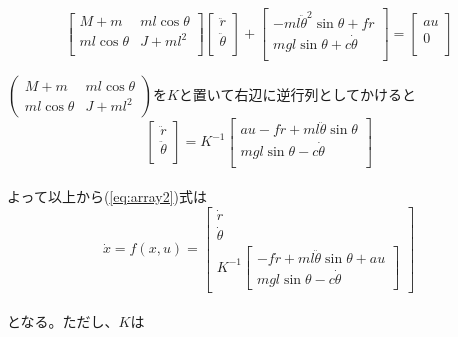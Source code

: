 	\[
		\left[
		\begin{array}{ccc}
			M + m & ml\cos{\theta} \\
			ml\cos{\theta} & J + ml^{2}\\
		\end{array}
		\right]
		\left[
		\begin{array}{ccc}
			\ddot{r} \\
			\ddot{\theta}\\
		\end{array}
		\right] +
		\left[
		\begin{array}{ccc}
			-ml\ddot{\theta}^{2}\sin{\theta} + f\dot{r}\\
			mgl\sin{\theta} + c\dot{\theta}\\
		\end{array}
		\right] = 
		\left[
		\begin{array}{ccc}
			au\\
			0\\
		\end{array}
		\right]
	\]
	
	$\begin{pmatrix} M + m & ml\cos{\theta} \\ ml\cos{\theta} & J + ml^{2} \end{pmatrix}$を$K$と置いて右辺に逆行列としてかけると\\
	
	\[
		\left[
		\begin{array}{ccc}
			\ddot{r}\\
			\ddot{\theta}\\
		\end{array}
		\right]=K^{-1}
		\left[
		\begin{array}{ccc}
			au-f\dot{r}+ml\ddot{\theta}\sin{\theta}\\
			mgl\sin{\theta} - c\dot{\theta}\\
		\end{array}
		\right]
	\]
	\\
	よって以上から(\ref{eq:array2})式は\\
	
	\begin{equation}
		\dot{x} = f(x,u)=\left[
		\begin{array}{ccc}
			\dot{r}\\
			\dot{\theta}\\
			K^{-1}\left[
			\begin{array}{ccc}
				-f\dot{r}+ml\ddot{\theta}\sin{\theta}+au\\
				mgl\sin{\theta}-c\dot{\theta}
			\end{array}
			\right]
		\end{array}
		\right]
		\label{eq:array3}
	\end{equation}
	\\
	となる。ただし、$K$は
	
